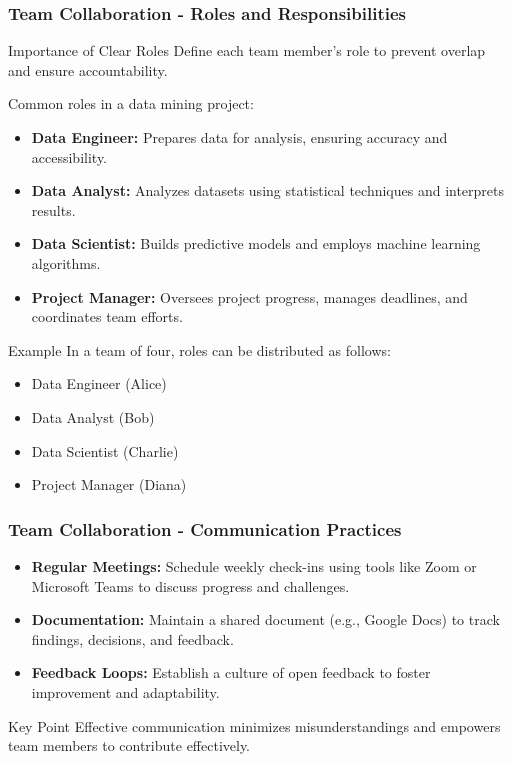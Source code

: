 \documentclass[aspectratio=169]{beamer}
\begin{document}
\begin{frame}[fragile]
    \frametitle{Team Collaboration - Roles and Responsibilities}
    \begin{block}{Importance of Clear Roles}
        Define each team member's role to prevent overlap and ensure accountability.
    \end{block}
    Common roles in a data mining project:
    \begin{itemize}
        \item \textbf{Data Engineer:} Prepares data for analysis, ensuring accuracy and accessibility.
        \item \textbf{Data Analyst:} Analyzes datasets using statistical techniques and interprets results.
        \item \textbf{Data Scientist:} Builds predictive models and employs machine learning algorithms.
        \item \textbf{Project Manager:} Oversees project progress, manages deadlines, and coordinates team efforts.
    \end{itemize}
    \begin{block}{Example}
        In a team of four, roles can be distributed as follows:
        \begin{itemize}
            \item Data Engineer (Alice)
            \item Data Analyst (Bob)
            \item Data Scientist (Charlie)
            \item Project Manager (Diana)
        \end{itemize}
    \end{block}
\end{frame}

\begin{frame}[fragile]
    \frametitle{Team Collaboration - Communication Practices}
    \begin{itemize}
        \item \textbf{Regular Meetings:} Schedule weekly check-ins using tools like Zoom or Microsoft Teams to discuss progress and challenges.
        \item \textbf{Documentation:} Maintain a shared document (e.g., Google Docs) to track findings, decisions, and feedback.
        \item \textbf{Feedback Loops:} Establish a culture of open feedback to foster improvement and adaptability.
    \end{itemize}
    \begin{block}{Key Point}
        Effective communication minimizes misunderstandings and empowers team members to contribute effectively.
    \end{block}
\end{frame}
\end{document}
